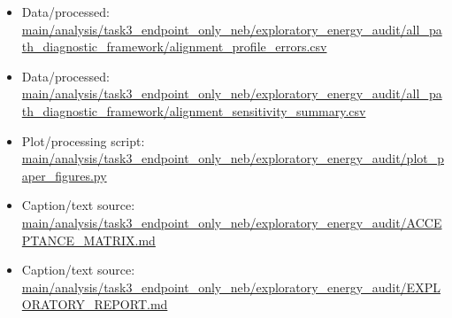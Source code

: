 \begin{itemize}[leftmargin=1.4em,noitemsep]
\item Data/processed: \begingroup\scriptsize\url{main/analysis/task3_endpoint_only_neb/exploratory_energy_audit/all_path_diagnostic_framework/alignment_profile_errors.csv}\endgroup
\item Data/processed: \begingroup\scriptsize\url{main/analysis/task3_endpoint_only_neb/exploratory_energy_audit/all_path_diagnostic_framework/alignment_sensitivity_summary.csv}\endgroup
\item Plot/processing script: \begingroup\scriptsize\url{main/analysis/task3_endpoint_only_neb/exploratory_energy_audit/plot_paper_figures.py}\endgroup
\item Caption/text source: \begingroup\scriptsize\url{main/analysis/task3_endpoint_only_neb/exploratory_energy_audit/ACCEPTANCE_MATRIX.md}\endgroup
\item Caption/text source: \begingroup\scriptsize\url{main/analysis/task3_endpoint_only_neb/exploratory_energy_audit/EXPLORATORY_REPORT.md}\endgroup
\end{itemize}
